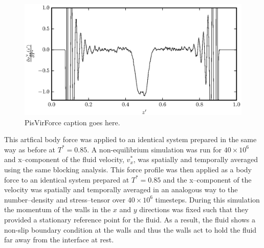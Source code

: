 \begin{figure}[h]
\centering
\includegraphics[scale=0.8]{PisVirForce}
\caption{PisVirForce caption goes here.}
\label{PisVirForce}
\end{figure}
\FloatBarrier

This artfical body force was applied to an identical system prepared in the same way as before at $T^{*} = 0.85$.
A non-equilibrium simulation was run for $40 \times 10^{6}$ and x--component of the fluid velocity, $v^{*}_{x}$, was spatially and temporally averaged using the same blocking analysis. 
This force profile was then applied as a body force to an identical system prepared at $T^{*} = 0.85$ and the x--component of the velocity was spatially and temporally averaged in an analogous way to the number--density and stress--tensor over $40 \times 10^{6}$ timesteps.
During this simulation the momentum of the walls in the $x$ and $y$ directions was fixed such that they provided a stationary reference point for the fluid.
As a result, the fluid shows a non-slip boundary condition at the walls and thus the walls act to hold the fluid far away from the interface at rest. 

